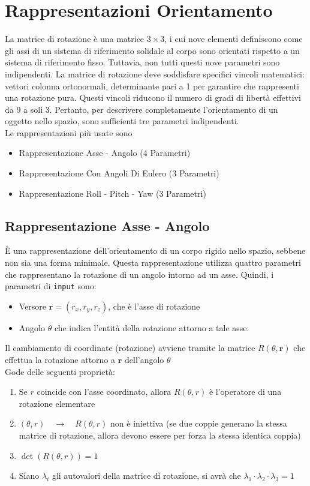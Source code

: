 \documentclass[11pt, a4paper]{report}
\begin{document}
\newpage
\section{Rappresentazioni Orientamento}
La matrice di rotazione è una matrice $3 \times 3$, i cui nove elementi definiscono come gli assi di un sistema di riferimento solidale al corpo sono orientati rispetto a un sistema di riferimento fisso. Tuttavia, non tutti questi nove parametri sono indipendenti. La matrice di rotazione deve soddisfare specifici vincoli matematici: vettori colonna ortonormali, determinante pari a 1 per garantire che rappresenti una rotazione pura. Questi vincoli riducono il numero di gradi di libertà effettivi da 9 a soli 3. Pertanto, per descrivere completamente l'orientamento di un oggetto nello spazio, sono sufficienti tre parametri indipendenti.\\
Le rappresentazioni più usate sono
\begin{itemize}
    \item Rappresentazione Asse - Angolo (4 Parametri)
    \item Rappresentazione Con Angoli Di Eulero (3 Parametri)
    \item Rappresentazione Roll - Pitch - Yaw (3 Parametri)
\end{itemize}

\subsection{Rappresentazione Asse - Angolo}
È una rappresentazione dell'orientamento di un corpo rigido nello spazio, sebbene non sia una forma minimale. Questa rappresentazione utilizza quattro parametri che rappresentano la rotazione di un angolo intorno ad un asse. Quindi, i parametri di \texttt{input} sono:
\begin{itemize}
    \item Versore \(\mathbf{r} = (r_x, r_y, r_z)\), che è l'asse di rotazione
    \item Angolo \(\theta\) che indica l'entità della rotazione attorno a tale asse.
\end{itemize}
Il cambiamento di coordinate (rotazione) avviene tramite la matrice $R(\theta, \mathbf{r})$ che effettua la rotazione attorno a \(\mathbf{r}\) dell'angolo \(\theta\)\\
Gode delle seguenti proprietà:
\begin{enumerate}
    \item Se \(r\) coincide con l'asse coordinato, allora \(R(\theta, r)\) è l'operatore di una rotazione elementare
    \item \((\theta, r) \quad \longrightarrow \quad R(\theta, r)\) non è iniettiva (se due coppie generano la stessa matrice di rotazione, allora devono essere per forza la stessa identica coppia)
    \item \(\det(R(\theta, r)) = 1\)
    \item Siano $\lambda_{i}$ gli autovalori della matrice di rotazione, si avrà che \(\lambda_{1} \cdot \lambda_{2} \cdot \lambda_{3} = 1\)
\end{enumerate}
\end{document}
